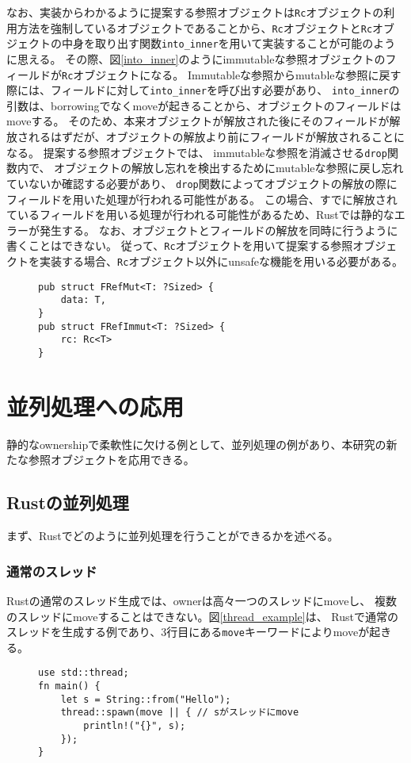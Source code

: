 \documentclass{sumiilab-paper}
\theoremstyle{mystyle}
\numberwithin{definition}{chapter} %
\begin{document}
なお、実装からわかるように提案する参照オブジェクトは\texttt{Rc}オブジェクトの利用方法を強制しているオブジェクトであることから、\texttt{Rc}オブジェクトと\texttt{Rc}オブジェクトの中身を取り出す関数\texttt{into\_inner}を用いて実装することが可能のように思える。
その際、図\ref{into_inner}のようにimmutableな参照オブジェクトのフィールドが\texttt{Rc}オブジェクトになる。
Immutableな参照からmutableな参照に戻す際には、フィールドに対して\texttt{into\_inner}を呼び出す必要があり、
\texttt{into\_inner}の引数は、borrowingでなくmoveが起きることから、オブジェクトのフィールドはmoveする。
そのため、本来オブジェクトが解放された後にそのフィールドが解放されるはずだが、オブジェクトの解放より前にフィールドが解放されることになる。
提案する参照オブジェクトでは、
immutableな参照を消滅させる\texttt{drop}関数内で、
オブジェクトの解放し忘れを検出するためにmutableな参照に戻し忘れていないか確認する必要があり、
\texttt{drop}関数によってオブジェクトの解放の際にフィールドを用いた処理が行われる可能性がある。
この場合、すでに解放されているフィールドを用いる処理が行われる可能性があるため、Rustでは静的なエラーが発生する。
なお、オブジェクトとフィールドの解放を同時に行うように書くことはできない。
従って、\texttt{Rc}オブジェクトを用いて提案する参照オブジェクトを実装する場合、\texttt{Rc}オブジェクト以外にunsafeな機能を用いる必要がある。

\begin{figure}[htp]
\begin{lstlisting}[caption=Rcオブジェクトと関数into\_innerによる実装の試み, label=into_inner, captionpos=b]
pub struct FRefMut<T: ?Sized> {
    data: T,
}
pub struct FRefImmut<T: ?Sized> {
    rc: Rc<T>
}
\end{lstlisting}
\end{figure}

\chapter{並列処理への応用}
静的なownershipで柔軟性に欠ける例として、並列処理の例があり、本研究の新たな参照オブジェクトを応用できる。

\section{Rustの並列処理}
まず、Rustでどのように並列処理を行うことができるかを述べる。
\subsection{通常のスレッド}
Rustの通常のスレッド生成では、ownerは高々一つのスレッドにmoveし、
複数のスレッドにmoveすることはできない。図\ref{thread_example}は、
Rustで通常のスレッドを生成する例であり、3行目にある\texttt{move}キーワードによりmoveが起きる。
\begin{figure}[htp]
\begin{lstlisting}[caption=Rustでの通常のスレッド生成の例, 
  label=thread_example, captionpos=b]
use std::thread;
fn main() {
    let s = String::from("Hello");
    thread::spawn(move || { // sがスレッドにmove
        println!("{}", s);
    });
}
\end{lstlisting}
\end{figure}
\end{document}
